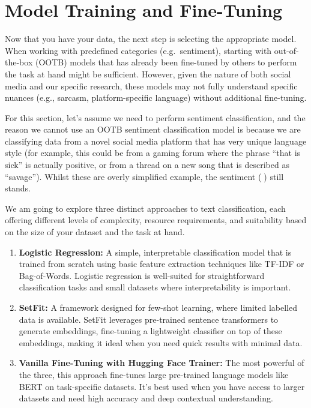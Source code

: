 \documentclass[
  letterpaper,
  DIV=11,
  numbers=noendperiod]{scrreprt}
\providecommand{\tightlist}{%
  \setlength{\itemsep}{0pt}\setlength{\parskip}{0pt}}\usepackage{longtable,booktabs,array}
\begin{document}
\chapter{Model Training and
Fine-Tuning}\label{model-training-and-fine-tuning}

Now that you have your data, the next step is selecting the appropriate
model. When working with predefined categories (e.g.~sentiment),
starting with out-of-the-box (OOTB) models that has already been
fine-tuned by others to perform the task at hand might be sufficient.
However, given the nature of both social media and our specific
research, these models may not fully understand specific nuances (e.g.,
sarcasm, platform-specific language) without additional fine-tuning.

For this section, let's assume we need to perform sentiment
classification, and the reason we cannot use an OOTB sentiment
classification model is because we are classifying data from a novel
social media platform that has very unique language style (for example,
this could be from a gaming forum where the phrase ``that is sick'' is
actually positive, or from a thread on a new song that is described as
``savage''). Whilst these are overly simplified example, the sentiment
(🥁) still stands.

We am going to explore three distinct approaches to text classification,
each offering different levels of complexity, resource requirements, and
suitability based on the size of your dataset and the task at hand.

\begin{enumerate}
\def\labelenumi{\arabic{enumi}.}
\tightlist
\item
  \textbf{Logistic Regression:} A simple, interpretable classification
  model that is trained from scratch using basic feature extraction
  techniques like TF-IDF or Bag-of-Words. Logistic regression is
  well-suited for straightforward classification tasks and small
  datasets where interpretability is important.
\item
  \textbf{SetFit:} A framework designed for few-shot learning, where
  limited labelled data is available. SetFit leverages pre-trained
  sentence transformers to generate embeddings, fine-tuning a
  lightweight classifier on top of these embeddings, making it ideal
  when you need quick results with minimal data.
\item
  \textbf{Vanilla Fine-Tuning with Hugging Face Trainer:} The most
  powerful of the three, this approach fine-tunes large pre-trained
  language models like BERT on task-specific datasets. It's best used
  when you have access to larger datasets and need high accuracy and
  deep contextual understanding.
\end{enumerate}
\end{document}
